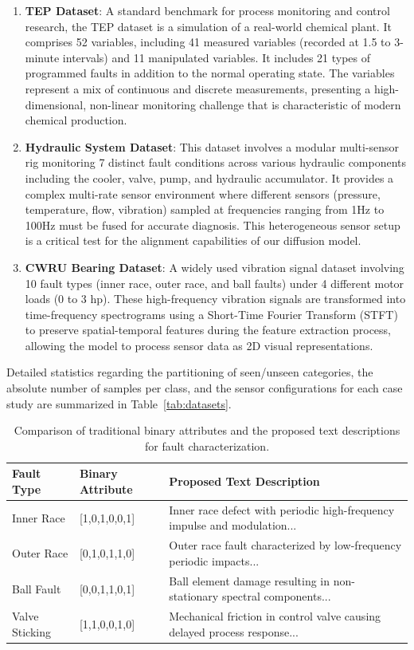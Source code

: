 \begin{enumerate}
    \item \textbf{TEP Dataset}: A standard benchmark for process monitoring and control research, the TEP dataset is a simulation of a real-world chemical plant. It comprises 52 variables, including 41 measured variables (recorded at 1.5 to 3-minute intervals) and 11 manipulated variables. It includes 21 types of programmed faults in addition to the normal operating state. The variables represent a mix of continuous and discrete measurements, presenting a high-dimensional, non-linear monitoring challenge that is characteristic of modern chemical production.
    \item \textbf{Hydraulic System Dataset}: This dataset involves a modular multi-sensor rig monitoring 7 distinct fault conditions across various hydraulic components including the cooler, valve, pump, and hydraulic accumulator. It provides a complex multi-rate sensor environment where different sensors (pressure, temperature, flow, vibration) sampled at frequencies ranging from 1Hz to 100Hz must be fused for accurate diagnosis. This heterogeneous sensor setup is a critical test for the alignment capabilities of our diffusion model.
    \item \textbf{CWRU Bearing Dataset}: A widely used vibration signal dataset involving 10 fault types (inner race, outer race, and ball faults) under 4 different motor loads (0 to 3 hp). These high-frequency vibration signals are transformed into time-frequency spectrograms using a Short-Time Fourier Transform (STFT) to preserve spatial-temporal features during the feature extraction process, allowing the model to process sensor data as 2D visual representations.
\end{enumerate}
Detailed statistics regarding the partitioning of seen/unseen categories, the absolute number of samples per class, and the sensor configurations for each case study are summarized in Table~\ref{tab:datasets}.

\begin{table}[htbp]
\centering
\caption{Comparison of traditional binary attributes and the proposed text descriptions for fault characterization.}
\label{tab:attribute_comparison}
\begin{tabular}{lll}
\hline
Fault Type & Binary Attribute & Proposed Text Description \\
\hline
Inner Race & [1,0,1,0,0,1] & Inner race defect with periodic high-frequency impulse and modulation... \\
Outer Race & [0,1,0,1,1,0] & Outer race fault characterized by low-frequency periodic impacts... \\
Ball Fault & [0,0,1,1,0,1] & Ball element damage resulting in non-stationary spectral components... \\
Valve Sticking & [1,1,0,0,1,0] & Mechanical friction in control valve causing delayed process response... \\
\hline
\end{tabular}
\end{table}

